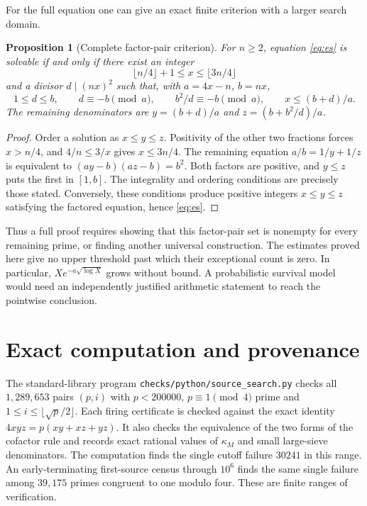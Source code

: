 \documentclass[11pt,a4paper]{amsart}
\newtheorem{proposition}[theorem]{Proposition}
\theoremstyle{definition}\newtheorem{definition}[theorem]{Definition}
\begin{document}
For the full equation one can give an exact finite criterion
with a larger search domain.
\begin{proposition}[Complete factor-pair criterion]\label{prop:full}
For $n\ge2$, equation \eqref{eq:es} is solvable if and only if
there exist an integer
\[
 \lfloor n/4\rfloor+1\le x\le\lfloor3n/4\rfloor
\]
and a divisor $d\mid(n x)^2$ such that, with $a=4x-n$, $b=nx$,
\[
 1\le d\le b,\qquad d\equiv-b\pmod a,\qquad
 b^2/d\equiv-b\pmod a,\qquad
 x\le (b+d)/a .
\]
The remaining denominators are $y=(b+d)/a$ and
$z=(b+b^2/d)/a$.
\end{proposition}
\begin{proof}
Order a solution as $x\le y\le z$. Positivity of the other
two fractions forces $x>n/4$, and
$4/n\le3/x$ gives $x\le3n/4$.
The remaining equation $a/b=1/y+1/z$ is equivalent to
$(ay-b)(az-b)=b^2$. Both factors are positive, and $y\le z$
puts the first in $[1,b]$. The integrality and ordering
conditions are precisely those stated.
Conversely, these conditions produce positive integers
$x\le y\le z$ satisfying the factored equation, hence
\eqref{eq:es}.
\end{proof}
Thus a full proof requires showing that this factor-pair set is
nonempty for every remaining prime, or finding another universal
construction. The estimates proved here give no upper threshold
past which their exceptional count is zero. In particular,
$Xe^{-a\sqrt{\log X}}$ grows without bound.
A probabilistic survival model would need an independently
justified arithmetic statement to reach the pointwise conclusion.



\section{Exact computation and provenance}
The standard-library program
\texttt{checks/python/source\_search.py}
checks all $1{,}289{,}653$ pairs
$(p,i)$ with $p<200000$, $p\equiv1\pmod4$ prime and
$1\le i\le\lfloor\sqrt p/2\rfloor$. Each firing certificate
is checked against the exact identity
$4xyz=p(xy+xz+yz)$. It also checks the equivalence of the two
forms of the cofactor rule and records exact rational values of
$\kappa_M$ and small large-sieve denominators. The computation
finds the single cutoff failure $30241$ in this range.
An early-terminating first-source census through $10^6$ finds
the same single failure among $39{,}175$ primes congruent to
one modulo four. These are finite ranges of verification.
\end{document}
